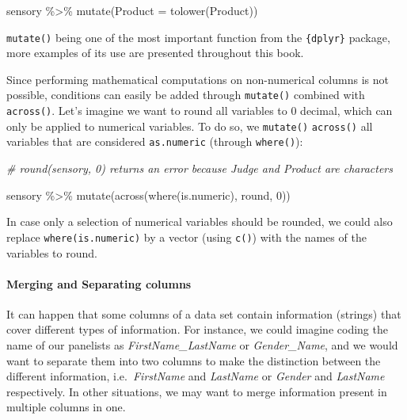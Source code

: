 \documentclass[
]{book}
\newenvironment{Shaded}{\begin{snugshade}}{\end{snugshade}}
\newcommand{\AttributeTok}[1]{\textcolor[rgb]{0.77,0.63,0.00}{#1}}
\newcommand{\CommentTok}[1]{\textcolor[rgb]{0.56,0.35,0.01}{\textit{#1}}}
\newcommand{\DecValTok}[1]{\textcolor[rgb]{0.00,0.00,0.81}{#1}}
\newcommand{\FunctionTok}[1]{\textcolor[rgb]{0.00,0.00,0.00}{#1}}
\newcommand{\NormalTok}[1]{#1}
\newcommand{\SpecialCharTok}[1]{\textcolor[rgb]{0.00,0.00,0.00}{#1}}
\begin{document}
\begin{Shaded}
\begin{Highlighting}[]
\NormalTok{sensory }\SpecialCharTok{\%\textgreater{}\%} 
  \FunctionTok{mutate}\NormalTok{(}\AttributeTok{Product =} \FunctionTok{tolower}\NormalTok{(Product))}
\end{Highlighting}
\end{Shaded}

\texttt{mutate()} being one of the most important function from the \texttt{\{dplyr\}} package, more examples of its use are presented throughout this book.

Since performing mathematical computations on non-numerical columns is not possible, conditions can easily be added through \texttt{mutate()} combined with \texttt{across()}. Let's imagine we want to round all variables to 0 decimal, which can only be applied to numerical variables.
To do so, we \texttt{mutate()} \texttt{across()} all variables that are considered \texttt{as.numeric} (through \texttt{where()}):

\begin{Shaded}
\begin{Highlighting}[]
\CommentTok{\# round(sensory, 0) returns an error because Judge and Product are characters}

\NormalTok{sensory }\SpecialCharTok{\%\textgreater{}\%} 
  \FunctionTok{mutate}\NormalTok{(}\FunctionTok{across}\NormalTok{(}\FunctionTok{where}\NormalTok{(is.numeric), round, }\DecValTok{0}\NormalTok{))}
\end{Highlighting}
\end{Shaded}

In case only a selection of numerical variables should be rounded, we could also replace \texttt{where(is.numeric)} by a vector (using \texttt{c()}) with the names of the variables to round.

\hypertarget{merging-and-separating-columns}{%
\paragraph{Merging and Separating columns}\label{merging-and-separating-columns}}

It can happen that some columns of a data set contain information (strings) that cover different types of information. For instance, we could imagine coding the name of our panelists as \emph{FirstName\_LastName} or \emph{Gender\_Name}, and we would want to separate them into two columns to make the distinction between the different information, i.e.~\emph{FirstName} and \emph{LastName} or \emph{Gender} and \emph{LastName} respectively. In other situations, we may want to merge information present in multiple columns in one.
\end{document}
